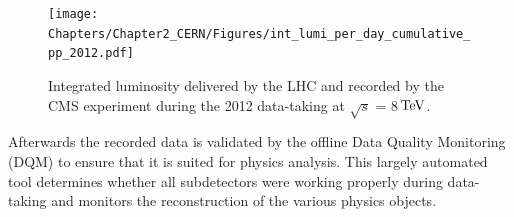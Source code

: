 \begin{figure}[h!t]
 \centering
 \texttt{[image: Chapters/Chapter2\_CERN/Figures/int\_lumi\_per\_day\_cumulative\_pp\_2012.pdf]}
 \caption{Integrated luminosity delivered by the LHC and recorded by the CMS experiment during the 2012 data-taking at $\sqrt{s}$ = 8$\, \mathrm{TeV}$.} \label{fig::LumiEff}
\end{figure}

Afterwards the recorded data is validated by the offline Data Quality Monitoring (DQM) to ensure that it is suited for physics analysis. This largely automated tool determines whether all subdetectors were working properly during data-taking and monitors the reconstruction of the various physics objects.

